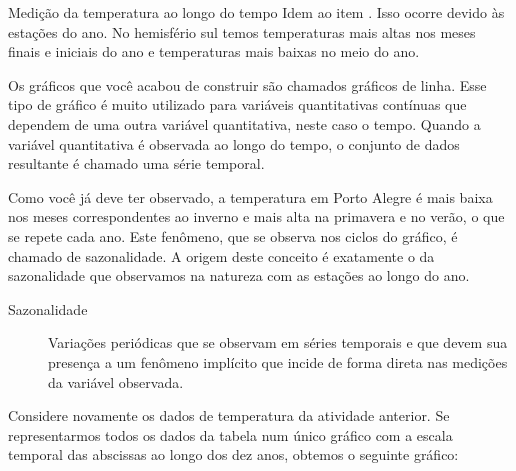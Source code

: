 {\begin{task}{Medição da temperatura ao longo do tempo}
 Idem ao item . Isso ocorre devido às estações do ano. No hemisfério sul temos temperaturas mais altas nos meses finais e iniciais do ano e temperaturas mais baixas no meio do ano.

Os gráficos que você acabou de construir são chamados gráficos de linha. Esse tipo de gráfico é muito utilizado para variáveis quantitativas contínuas que dependem de uma outra variável quantitativa, neste caso o tempo. Quando a variável quantitativa é observada ao longo do tempo, o conjunto de dados resultante é chamado uma série temporal.

\end{task}

\begin{observation}{}

Como você já deve ter observado, a temperatura em Porto Alegre é mais baixa nos meses correspondentes ao inverno e mais alta na primavera e no verão, o que se repete cada ano. Este fenômeno, que se observa nos ciclos do gráfico, é chamado de sazonalidade. A origem deste conceito é exatamente o da sazonalidade que observamos na natureza com as estações ao longo do ano.
\end{observation}
\begin{description}
\item[{Sazonalidade}] \leavevmode{}\label{est1-def-13}
Variações periódicas que se observam em séries temporais e que devem sua presença a um fenômeno implícito que incide de forma direta nas medições da variável observada.

\end{description}

Considere novamente os dados de temperatura da atividade anterior. Se representarmos todos os dados da tabela num único gráfico com a escala temporal das abscissas ao longo dos dez anos, obtemos o seguinte gráfico:

\begin{figure}[H]
\centering
\capstart

\end{figure}}
